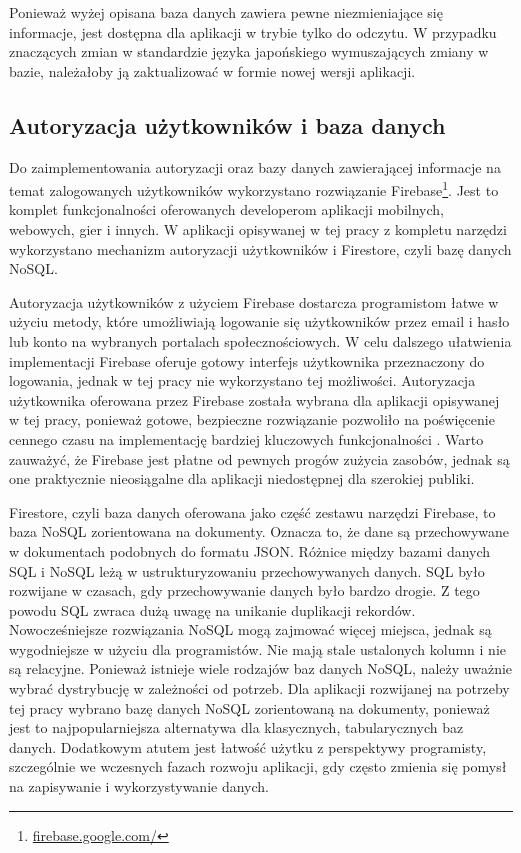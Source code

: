 \documentclass[a4paper,twoside,12pt]{book}
\begin{document}
Ponieważ wyżej opisana baza danych zawiera pewne niezmieniające się informacje, jest dostępna dla aplikacji w trybie tylko do odczytu. W przypadku znaczących zmian w standardzie języka japońskiego wymuszających zmiany w bazie, należałoby ją zaktualizować w formie nowej wersji aplikacji.

\subsection{Autoryzacja użytkowników i baza danych}
Do zaimplementowania autoryzacji oraz bazy danych zawierającej informacje na temat zalogowanych użytkowników wykorzystano rozwiązanie Firebase\footnote{\url{firebase.google.com/}}. Jest to komplet funkcjonalności oferowanych developerom aplikacji mobilnych, webowych, gier i innych. W aplikacji opisywanej w tej pracy z kompletu narzędzi wykorzystano mechanizm autoryzacji użytkowników i Firestore, czyli bazę danych NoSQL. 

Autoryzacja użytkowników z użyciem Firebase dostarcza programistom łatwe w użyciu metody, które umożliwiają logowanie się użytkowników przez email i hasło lub konto na wybranych portalach społecznościowych. W celu dalszego ułatwienia implementacji Firebase oferuje gotowy interfejs użytkownika przeznaczony do logowania, jednak w tej pracy nie wykorzystano tej możliwości. Autoryzacja użytkownika oferowana przez Firebase została wybrana dla aplikacji opisywanej w tej pracy, ponieważ gotowe, bezpieczne rozwiązanie pozwoliło na poświęcenie cennego czasu na implementację bardziej kluczowych funkcjonalności \cite{bib:ksiazkaFirebase}. Warto zauważyć, że Firebase jest płatne od pewnych progów zużycia zasobów, jednak są one praktycznie nieosiągalne dla aplikacji niedostępnej dla szerokiej publiki.

Firestore, czyli baza danych oferowana jako część zestawu narzędzi Firebase, to baza NoSQL zorientowana na dokumenty. Oznacza to, że dane są przechowywane w dokumentach podobnych do formatu JSON. Różnice między bazami danych SQL i NoSQL leżą w ustrukturyzowaniu przechowywanych danych. SQL było rozwijane w czasach, gdy przechowywanie danych było bardzo drogie. Z tego powodu SQL zwraca dużą uwagę na unikanie duplikacji rekordów. Nowocześniejsze rozwiązania NoSQL mogą zajmować więcej miejsca, jednak są wygodniejsze w użyciu dla programistów. Nie mają stale ustalonych kolumn i nie są relacyjne. Ponieważ istnieje wiele rodzajów baz danych NoSQL, należy uważnie wybrać dystrybucję w zależności od potrzeb. Dla aplikacji rozwijanej na potrzeby tej pracy wybrano bazę danych NoSQL zorientowaną na dokumenty, ponieważ jest to najpopularniejsza alternatywa dla klasycznych, tabularycznych baz danych. Dodatkowym atutem jest łatwość użytku z perspektywy programisty, szczególnie we wczesnych fazach rozwoju aplikacji, gdy często zmienia się pomysł na zapisywanie i wykorzystywanie danych. 
\end{document}
